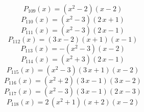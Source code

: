 \subitem \begin{dmath*}P_{109}(x) = {\left(x^{2} - 2\right)} {\left(x - 2\right)} \end{dmath*}\vspace{- 1.20000000000000 cm}
\subitem \begin{dmath*}P_{110}(x) = {\left(x^{2} - 3\right)} {\left(2 \, x + 1\right)} \end{dmath*}\vspace{- 1.20000000000000 cm}
\subitem \begin{dmath*}P_{111}(x) = {\left(x^{2} - 3\right)} {\left(2 \, x - 1\right)} \end{dmath*}\vspace{- 1.20000000000000 cm}
\subitem \begin{dmath*}P_{112}(x) = {\left(3 \, x - 2\right)} {\left(x + 1\right)} {\left(x - 1\right)} \end{dmath*}\vspace{- 1.20000000000000 cm}
\subitem \begin{dmath*}P_{113}(x) = -{\left(x^{2} - 3\right)} {\left(x - 2\right)} \end{dmath*}\vspace{- 1.20000000000000 cm}
\subitem \begin{dmath*}P_{114}(x) = {\left(x^{2} + 3\right)} {\left(2 \, x - 1\right)} \end{dmath*}\vspace{- 1.20000000000000 cm}
\subitem \begin{dmath*}P_{115}(x) = {\left(x^{2} - 3\right)} {\left(3 \, x + 1\right)} {\left(x - 2\right)} \end{dmath*}\vspace{- 1.20000000000000 cm}
\subitem \begin{dmath*}P_{116}(x) = {\left(x^{2} + 2\right)} {\left(3 \, x - 1\right)} {\left(3 \, x - 2\right)} \end{dmath*}\vspace{- 1.20000000000000 cm}
\subitem \begin{dmath*}P_{117}(x) = {\left(x^{2} - 3\right)} {\left(3 \, x - 1\right)} {\left(2 \, x - 3\right)} \end{dmath*}\vspace{- 1.20000000000000 cm}
\subitem \begin{dmath*}P_{118}(x) = 2 \, {\left(x^{2} + 1\right)} {\left(x + 2\right)} {\left(x - 2\right)} \end{dmath*}\vspace{- 1.20000000000000 cm}
